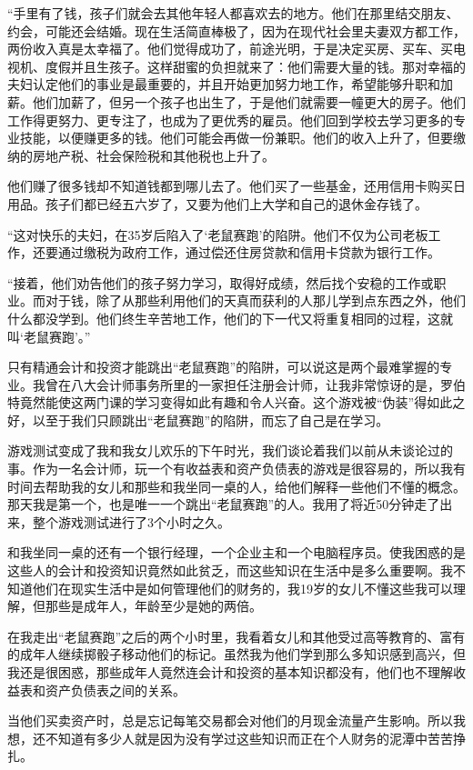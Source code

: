 “手里有了钱，孩子们就会去其他年轻人都喜欢去的地方。他们在那里结交朋友、约会，可能还会结婚。现在生活简直棒极了，因为在现代社会里夫妻双方都工作，两份收入真是太幸福了。他们觉得成功了，前途光明，于是决定买房、买车、买电视机、度假并且生孩子。这样甜蜜的负担就来了：他们需要大量的钱。那对幸福的夫妇认定他们的事业是最重要的，并且开始更加努力地工作，希望能够升职和加薪。他们加薪了，但另一个孩子也出生了，于是他们就需要一幢更大的房子。他们工作得更努力、更专注了，也成为了更优秀的雇员。他们回到学校去学习更多的专业技能，以便赚更多的钱。他们可能会再做一份兼职。他们的收入上升了，但要缴纳的房地产税、社会保险税和其他税也上升了。

他们赚了很多钱却不知道钱都到哪儿去了。他们买了一些基金，还用信用卡购买日用品。孩子们都已经五六岁了，又要为他们上大学和自己的退休金存钱了。

“这对快乐的夫妇，在35岁后陷入了‘老鼠赛跑’的陷阱。他们不仅为公司老板工作，还要通过缴税为政府工作，通过偿还住房贷款和信用卡贷款为银行工作。

“接着，他们劝告他们的孩子努力学习，取得好成绩，然后找个安稳的工作或职业。而对于钱，除了从那些利用他们的天真而获利的人那儿学到点东西之外，他们什么都没学到。他们终生辛苦地工作，他们的下一代又将重复相同的过程，这就叫‘老鼠赛跑’。”

只有精通会计和投资才能跳出“老鼠赛跑”的陷阱，可以说这是两个最难掌握的专业。我曾在八大会计师事务所里的一家担任注册会计师，让我非常惊讶的是，罗伯特竟然能使这两门课的学习变得如此有趣和令人兴奋。这个游戏被“伪装”得如此之好，以至于我们只顾跳出“老鼠赛跑”的陷阱，而忘了自己是在学习。

游戏测试变成了我和我女儿欢乐的下午时光，我们谈论着我们以前从未谈论过的事。作为一名会计师，玩一个有收益表和资产负债表的游戏是很容易的，所以我有时间去帮助我的女儿和那些和我坐同一桌的人，给他们解释一些他们不懂的概念。那天我是第一个，也是唯一一个跳出“老鼠赛跑”的人。我用了将近50分钟走了出来，整个游戏测试进行了3个小时之久。

和我坐同一桌的还有一个银行经理，一个企业主和一个电脑程序员。使我困惑的是这些人的会计和投资知识竟然如此贫乏，而这些知识在生活中是多么重要啊。我不知道他们在现实生活中是如何管理他们的财务的，我19岁的女儿不懂这些我可以理解，但那些是成年人，年龄至少是她的两倍。

在我走出“老鼠赛跑”之后的两个小时里，我看着女儿和其他受过高等教育的、富有的成年人继续掷骰子移动他们的标记。虽然我为他们学到那么多知识感到高兴，但我还是很困惑，那些成年人竟然连会计和投资的基本知识都没有，他们也不理解收益表和资产负债表之间的关系。

当他们买卖资产时，总是忘记每笔交易都会对他们的月现金流量产生影响。所以我想，还不知道有多少人就是因为没有学过这些知识而正在个人财务的泥潭中苦苦挣扎。

